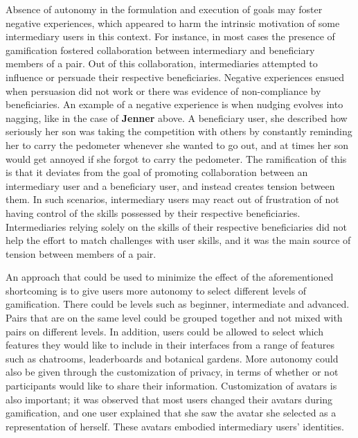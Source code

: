 Absence of autonomy in the formulation and execution of goals may foster  negative experiences, which appeared to harm the intrinsic motivation of some intermediary users in this context. For instance, in most cases the presence of gamification fostered collaboration between intermediary and beneficiary members of a pair. Out of this collaboration, intermediaries attempted to influence or persuade their respective beneficiaries. Negative experiences ensued when persuasion did not work or there was evidence of non-compliance by beneficiaries. An example of a negative experience is when nudging evolves into nagging, like in the case of \textbf{Jenner} above. A beneficiary user, she described how seriously her son was taking the competition with others by constantly reminding her to carry the pedometer whenever she wanted to go out, and at times her son would get annoyed if she forgot to carry the pedometer. The ramification of this is that it deviates from the goal of promoting collaboration between an intermediary user and a beneficiary user, and instead creates tension between them. In such scenarios, intermediary users may react out of frustration of not having control of the skills possessed by their respective beneficiaries. Intermediaries relying solely on the skills of their respective beneficiaries did  not help the effort to match challenges with user skills, and it was the main source of tension between members of a pair. 

An approach that could be used to minimize the effect of the  aforementioned shortcoming is to give users more autonomy to select different levels of gamification. There could be levels such as beginner, intermediate and advanced. Pairs that are on the same level could be grouped together and not mixed with pairs on different levels. In addition, users could be allowed to select which features they would like to include in their interfaces from a range of features such as chatrooms, leaderboards and botanical gardens. More autonomy could also be given through the customization of privacy, in terms of whether or not participants would like to share their information. Customization of avatars is also important; it was observed that most users changed their avatars during gamification, and one user explained that she saw the avatar she selected as a representation of herself. These avatars embodied intermediary users' identities.

